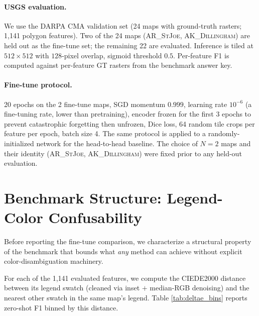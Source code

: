 \documentclass[sigconf,nonacm]{acmart}
\begin{document}
\paragraph{USGS evaluation.} We use the DARPA CMA validation set (24 maps with
ground-truth rasters; 1{,}141 polygon features). Two of the 24 maps
(\textsc{AR\_StJoe}, \textsc{AK\_Dillingham}) are held out as the fine-tune set;
the remaining 22 are evaluated. Inference is tiled at $512{\times}512$ with
$128$-pixel overlap, sigmoid threshold $0.5$. Per-feature F1 is computed
against per-feature GT rasters from the benchmark answer key.

\paragraph{Fine-tune protocol.} 20 epochs on the 2 fine-tune maps, SGD
momentum $0.999$, learning rate $10^{-6}$ (a fine-tuning rate, lower than
pretraining), encoder frozen for the first 3 epochs to prevent catastrophic
forgetting then unfrozen, Dice loss, 64 random tile crops per feature per
epoch, batch size 4. The same protocol is applied to a randomly-initialized
network for the head-to-head baseline. The choice of $N{=}2$ maps and their
identity (\textsc{AR\_StJoe}, \textsc{AK\_Dillingham}) were fixed prior to any
held-out evaluation.

\section{Benchmark Structure: Legend-Color Confusability}
\label{sec:diagnostic}

Before reporting the fine-tune comparison, we characterize a structural
property of the benchmark that bounds what \emph{any} method can achieve
without explicit color-disambiguation machinery.

For each of the 1{,}141 evaluated features, we compute the CIEDE2000
distance between its legend swatch (cleaned via inset $+$ median-RGB
denoising) and the nearest other swatch in the same map's legend. Table
\ref{tab:deltae_bins} reports zero-shot F1 binned by this distance.
\end{document}

